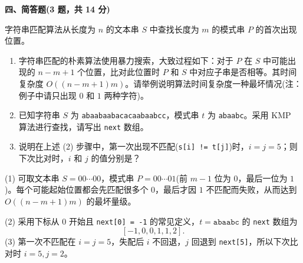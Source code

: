 \textbf{四、简答题(3 题，共 14 分)}

\begin{question}
字符串匹配算法从长度为 $n$ 的文本串 $S$ 中查找长度为 $m$ 的模式串 $P$ 的首次出现位置。
\begin{enumerate}
  \item 字符串匹配的朴素算法使用暴力搜索，大致过程如下：对于 $P$ 在 $S$ 中可能出现的 $n-m+1$ 个位置，比对此位置时 $P$ 和 $S$ 中对应子串是否相等。其时间复杂度 $O((n-m+1)m)$。请举例说明算法时间复杂度一种最坏情况(注：例子中请只出现 $0$ 和 $1$ 两种字符)。
  \item 已知字符串 $S$ 为 \texttt{abaabaabacacaabaabcc}，模式串 $t$ 为 \texttt{abaabc}。采用 KMP 算法进行查找，请写出 \texttt{next} 数组。
  \item 说明在上述 (2) 步骤中，第一次出现不匹配(\texttt{s[i] != t[j]})时，$i=j=5$；则下次比对时，$i$ 和 $j$ 的值分别是？
\end{enumerate}
\begin{solution}
(1) 可取文本串 $S=00\cdots 00$，模式串 $P=00\cdots 01$(前 $m-1$ 位为 $0$，最后一位为 $1$)。每个可能起始位置都会先匹配很多个 $0$，最后才因 $1$ 不匹配而失败，从而达到 $O((n-m+1)m)$ 的最坏量级。\par
(2) 采用下标从 $0$ 开始且 \texttt{next[0] = -1} 的常见定义，$t=\texttt{abaabc}$ 的 \texttt{next} 数组为
\[
[-1,0,0,1,1,2].
\]
(3) 第一次不匹配在 $i=j=5$，失配后 $i$ 不回退，$j$ 回退到 \texttt{next[5]}，所以下次比对时 $i=5,j=2$。
\end{solution}
\end{question}

